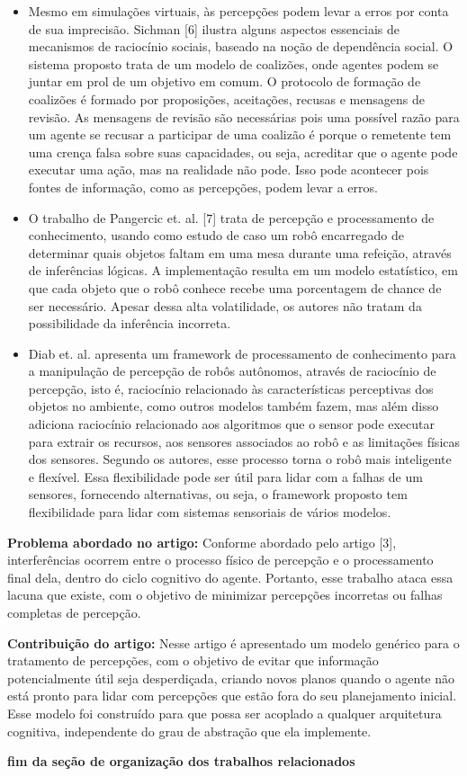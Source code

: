 \begin{itemize}
    \item Mesmo em simulações virtuais, às percepções podem levar a erros por conta de sua imprecisão. Sichman [6] ilustra alguns aspectos essenciais de mecanismos de raciocínio sociais, baseado na noção de dependência social. O sistema proposto trata de um modelo de coalizões, onde agentes podem se juntar em prol de um objetivo em comum. O protocolo de formação de coalizões é formado por proposições, aceitações, recusas e mensagens de revisão. As mensagens de revisão são necessárias pois uma possível razão para um agente se recusar a participar de uma coalizão é porque o remetente tem uma crença falsa sobre suas capacidades, ou seja, acreditar que o agente pode executar uma ação, mas na realidade não pode. Isso pode acontecer pois fontes de informação, como as percepções, podem levar a erros.

    \item O trabalho de Pangercic et. al. [7] trata de percepção e processamento de conhecimento, usando como estudo de caso um robô encarregado de determinar quais objetos faltam em uma mesa durante uma refeição, através de inferências lógicas. A implementação resulta em um modelo estatístico, em que cada objeto que o robô conhece recebe uma porcentagem de chance de ser necessário. Apesar dessa alta volatilidade, os autores não tratam da possibilidade da inferência incorreta.
    
    \item Diab et. al. apresenta um framework de processamento de conhecimento para a manipulação de percepção de robôs autônomos, através de raciocínio de percepção, isto é, raciocínio relacionado às características perceptivas dos objetos no ambiente, como outros modelos também fazem, mas além disso adiciona raciocínio relacionado aos algoritmos que o sensor pode executar para extrair os recursos, aos sensores associados ao robô e as limitações físicas dos sensores. Segundo os autores, esse processo torna o robô mais inteligente e flexível. Essa flexibilidade pode ser útil para lidar com a falhas de um sensores, fornecendo alternativas, ou seja, o framework proposto tem flexibilidade para lidar com sistemas sensoriais de vários modelos.
    
\end{itemize}

\textbf{Problema abordado no artigo:} Conforme abordado pelo artigo [3], interferências ocorrem entre o processo físico de percepção e o processamento final dela, dentro do ciclo cognitivo do agente. Portanto, esse trabalho ataca essa lacuna que existe, com o objetivo de minimizar percepções incorretas ou falhas completas de percepção.

\textbf{Contribuição do artigo:} Nesse artigo é apresentado um modelo genérico para o tratamento de percepções, com o objetivo de evitar que informação potencialmente útil seja desperdiçada, criando novos planos quando o agente não está pronto para lidar com percepções que estão fora do seu planejamento inicial. Esse modelo foi construído para que possa ser acoplado a qualquer arquitetura cognitiva, independente do grau de abstração que ela implemente.

\textbf{fim da seção de organização dos trabalhos relacionados}
\fi